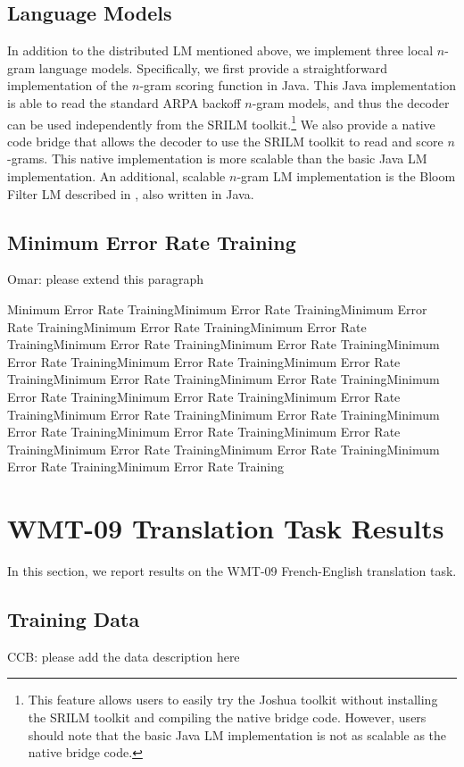 \documentclass[11pt]{article}
\begin{document}
\subsection{Language Models}
In addition to the distributed LM mentioned above, we implement three local $n$-gram language models. Specifically, we first provide a straightforward implementation of the $n$-gram scoring function in Java. This Java implementation is able to read the standard ARPA backoff $n$-gram models, and thus the decoder can be used independently from the SRILM toolkit.\footnote{This feature allows users to easily try the Joshua toolkit without installing the SRILM toolkit and compiling the native bridge code. However, users should note that the basic Java LM implementation is not as scalable as the native bridge code.} We also provide a native code bridge that allows the decoder to use the SRILM toolkit to read and score $n$-grams. This native implementation is more scalable than the basic Java LM implementation. An additional, scalable $n$-gram LM implementation is the Bloom Filter LM described in , also written in Java.

\subsection{Minimum Error Rate Training}
Omar: please extend this paragraph

Minimum Error Rate TrainingMinimum Error Rate TrainingMinimum Error Rate TrainingMinimum Error Rate TrainingMinimum Error Rate TrainingMinimum Error Rate TrainingMinimum Error Rate TrainingMinimum Error Rate TrainingMinimum Error Rate TrainingMinimum Error Rate TrainingMinimum Error Rate TrainingMinimum Error Rate TrainingMinimum Error Rate TrainingMinimum Error Rate TrainingMinimum Error Rate TrainingMinimum Error Rate TrainingMinimum Error Rate TrainingMinimum Error Rate TrainingMinimum Error Rate TrainingMinimum Error Rate TrainingMinimum Error Rate TrainingMinimum Error Rate TrainingMinimum Error Rate TrainingMinimum Error Rate Training



\section{WMT-09 Translation Task Results}
In this section, we report results on the WMT-09 French-English translation task.
\subsection{Training Data}
CCB: please add the data description here
\end{document}
